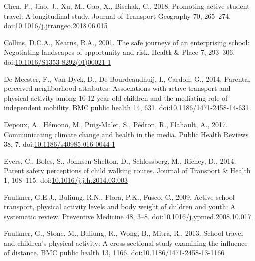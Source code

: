 \documentclass[]{elsarticle} %
\begin{document}
\leavevmode\hypertarget{ref-chenPromotingActiveStudent2018}{}%
Chen, P., Jiao, J., Xu, M., Gao, X., Bischak, C., 2018. Promoting active
student travel: A longitudinal study. Journal of Transport Geography 70,
265--274.
doi:\href{https://doi.org/10.1016/j.jtrangeo.2018.06.015}{10.1016/j.jtrangeo.2018.06.015}

\leavevmode\hypertarget{ref-collinsSafeJourneysEnterprising2001}{}%
Collins, D.C.A., Kearns, R.A., 2001. The safe journeys of an
enterprising school: Negotiating landscapes of opportunity and risk.
Health \& Place 7, 293--306.
doi:\href{https://doi.org/10.1016/S1353-8292(01)00021-1}{10.1016/S1353-8292(01)00021-1}

\leavevmode\hypertarget{ref-demeesterParentalPerceivedNeighborhood2014}{}%
De Meester, F., Van Dyck, D., De Bourdeaudhuij, I., Cardon, G., 2014.
Parental perceived neighborhood attributes: Associations with active
transport and physical activity among 10-12 year old children and the
mediating role of independent mobility. BMC public health 14, 631.
doi:\href{https://doi.org/10.1186/1471-2458-14-631}{10.1186/1471-2458-14-631}

\leavevmode\hypertarget{ref-depouxCommunicatingClimateChange2017}{}%
Depoux, A., Hémono, M., Puig-Malet, S., Pédron, R., Flahault, A., 2017.
Communicating climate change and health in the media. Public Health
Reviews 38, 7.
doi:\href{https://doi.org/10.1186/s40985-016-0044-1}{10.1186/s40985-016-0044-1}

\leavevmode\hypertarget{ref-eversParentSafetyPerceptions2014}{}%
Evers, C., Boles, S., Johnson-Shelton, D., Schlossberg, M., Richey, D.,
2014. Parent safety perceptions of child walking routes. Journal of
Transport \& Health 1, 108--115.
doi:\href{https://doi.org/10.1016/j.jth.2014.03.003}{10.1016/j.jth.2014.03.003}

\leavevmode\hypertarget{ref-faulknerActiveSchoolTransport2009}{}%
Faulkner, G.E.J., Buliung, R.N., Flora, P.K., Fusco, C., 2009. Active
school transport, physical activity levels and body weight of children
and youth: A systematic review. Preventive Medicine 48, 3--8.
doi:\href{https://doi.org/10.1016/j.ypmed.2008.10.017}{10.1016/j.ypmed.2008.10.017}

\leavevmode\hypertarget{ref-faulknerSchoolTravelChildren2013}{}%
Faulkner, G., Stone, M., Buliung, R., Wong, B., Mitra, R., 2013. School
travel and children's physical activity: A cross-sectional study
examining the influence of distance. BMC public health 13, 1166.
doi:\href{https://doi.org/10.1186/1471-2458-13-1166}{10.1186/1471-2458-13-1166}
\end{document}
